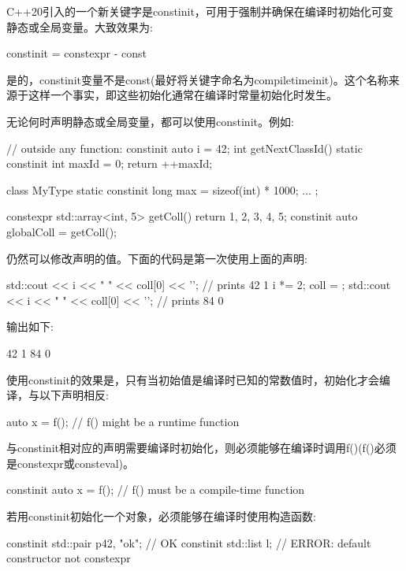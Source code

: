 
C++20引入的一个新关键字是constinit，可用于强制并确保在编译时初始化可变静态或全局变量。大致效果为:

\begin{cpp}
constinit = constexpr - const
\end{cpp}

是的，constinit变量不是const(最好将关键字命名为compiletimeinit)。这个名称来源于这样一个事实，即这些初始化通常在编译时常量初始化时发生。

无论何时声明静态或全局变量，都可以使用constinit。例如:

\begin{cpp}
// outside any function:
constinit auto i = 42;
int getNextClassId() {
	static constinit int maxId = 0;
	return ++maxId;
}

class MyType {
	static constinit long max = sizeof(int) * 1000;
	...
};

constexpr std::array<int, 5> getColl() {
	return {1, 2, 3, 4, 5};
}
constinit auto globalColl = getColl();
\end{cpp}

仍然可以修改声明的值。下面的代码是第一次使用上面的声明:

\begin{cpp}
std::cout << i << " " << coll[0] << '\n'; // prints 42 1
i *= 2;
coll = {};
std::cout << i << " " << coll[0] << '\n'; // prints 84 0
\end{cpp}

输出如下:

\begin{shell}
42 1
84 0
\end{shell}

使用constinit的效果是，只有当初始值是编译时已知的常数值时，初始化才会编译，与以下声明相反:

\begin{cpp}
auto x = f(); // f() might be a runtime function
\end{cpp}

与constinit相对应的声明需要编译时初始化，则必须能够在编译时调用f()(f()必须是constexpr或consteval)。

\begin{cpp}
constinit auto x = f(); // f() must be a compile-time function
\end{cpp}

若用constinit初始化一个对象，必须能够在编译时使用构造函数:

\begin{cpp}
constinit std::pair p{42, "ok"}; // OK constinit std::list l; // ERROR: default constructor not constexpr
\end{cpp}

